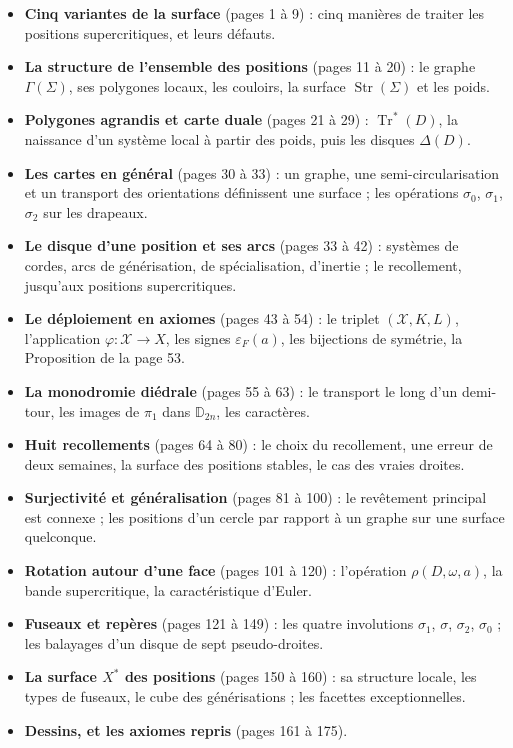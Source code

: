 \documentclass[11pt,a4paper]{article}
\begin{document}
\begin{itemize}
\item \textbf{Cinq variantes de la surface} (pages 1 à 9) : cinq manières de
traiter les positions supercritiques, et leurs défauts.
\item \textbf{La structure de l'ensemble des positions} (pages 11 à 20) : le
graphe $\Gamma(\Sigma)$, ses polygones locaux, les couloirs, la surface
$\operatorname{Str}(\Sigma)$ et les poids.
\item \textbf{Polygones agrandis et carte duale} (pages 21 à 29) :
$\operatorname{Tr}^{*}(D)$, la naissance d'un système local à partir des poids,
puis les disques $\Delta(D)$.
\item \textbf{Les cartes en général} (pages 30 à 33) : un graphe, une
semi-circularisation et un transport des orientations définissent une surface ;
les opérations $\sigma_0$, $\sigma_1$, $\sigma_2$ sur les drapeaux.
\item \textbf{Le disque d'une position et ses arcs} (pages 33 à 42) : systèmes
de cordes, arcs de générisation, de spécialisation, d'inertie ; le recollement,
jusqu'aux positions supercritiques.
\item \textbf{Le déploiement en axiomes} (pages 43 à 54) : le triplet
$(\mathcal{X}, K, L)$, l'application $\varphi : \mathcal{X} \to X$, les signes
$\varepsilon_F(a)$, les bijections de symétrie, la Proposition de la page 53.
\item \textbf{La monodromie diédrale} (pages 55 à 63) : le transport le long
d'un demi-tour, les images de $\pi_1$ dans $\mathbb{D}_{2n}$, les caractères.
\item \textbf{Huit recollements} (pages 64 à 80) : le choix du recollement, une
erreur de deux semaines, la surface des positions stables, le cas des vraies
droites.
\item \textbf{Surjectivité et généralisation} (pages 81 à 100) : le revêtement
principal est connexe ; les positions d'un cercle par rapport à un graphe sur
une surface quelconque.
\item \textbf{Rotation autour d'une face} (pages 101 à 120) : l'opération
$\rho(D, \omega, a)$, la bande supercritique, la caractéristique d'Euler.
\item \textbf{Fuseaux et repères} (pages 121 à 149) : les quatre involutions
$\sigma_1$, $\sigma$, $\sigma_2$, $\sigma_0$ ; les balayages d'un disque de sept
pseudo-droites.
\item \textbf{La surface $X^{*}$ des positions} (pages 150 à 160) : sa structure
locale, les types de fuseaux, le cube des générisations ; les facettes
exceptionnelles.
\item \textbf{Dessins, et les axiomes repris} (pages 161 à 175).
\end{itemize}
\end{document}
